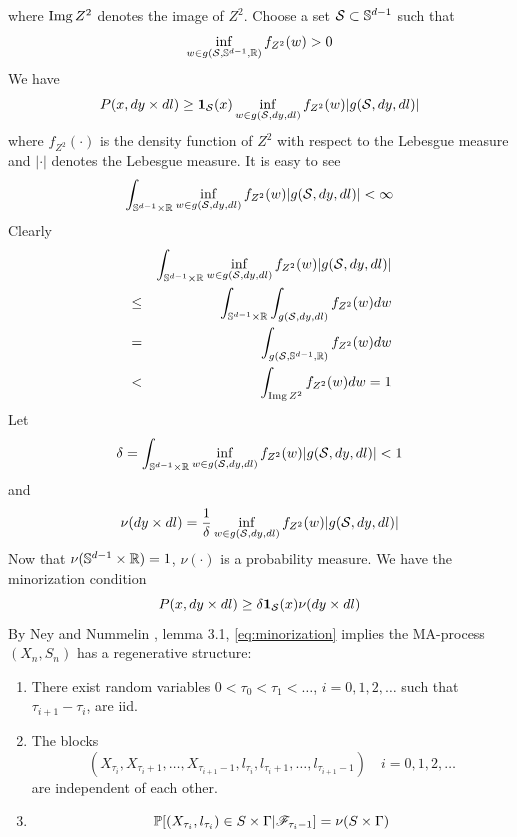 where $\img Z^2$ denotes the image of $Z^2$.
Choose a set $\mathcal S \subset \sphere^{d-1}$ such that
\[
\inf_{w \in g(\mathcal S, \sphere^{d-1}, \reals)} f_{Z^2}(w) > 0
\]
We have
\begin{eqnarray*}
  P(x, dy \times dl) \geq
  \I_{\mathcal S}(x) \inf_{w \in g(\mathcal S, dy, dl)} f_{Z^2}(w)
  | g(\mathcal S, dy, dl)| 
\end{eqnarray*}
where $f_{Z^2}(\cdot)$ is the density function of $Z^2$ with respect to the
Lebesgue measure and $|\cdot|$ denotes the Lebesgue measure. It is
easy to see
\[
\int_{\sphere^{d-1} \times \reals} \inf_{w \in g(\mathcal S, dy, dl)} f_{Z^2}(w)
| g(\mathcal S, dy, dl)| < \infty
\]
Clearly
\begin{eqnarray*}
  &&
  \int_{\sphere^{d-1} \times \reals} \inf_{w \in g(\mathcal S, dy, dl)} f_{Z^2}(w)
  | g(\mathcal S, dy, dl)| \\
  &\leq&
  \int_{\sphere^{d-1} \times \reals}
  \int_{g(\mathcal S, dy, dl)} f_{Z^2}(w) dw \\
  &=&
  \int_{g(\mathcal S, \sphere^{d-1}, \reals)} f_{Z^2}(w) dw \\
  &<&
  \int_{\img Z^2} f_{Z^2}(w) dw = 1
\end{eqnarray*}
Let
\[
\delta = \int_{\sphere^{d-1} \times \reals}
\inf_{w \in g(\mathcal S, dy, dl)} f_{Z^2}(w)
| g(\mathcal S, dy, dl)| < 1
\]
and
\[
\nu(dy \times dl) = {1 \over \delta}
\inf_{w \in g(\mathcal S, dy, dl)} f_{Z^2}(w)
| g(\mathcal S, dy, dl)|
\]
Now that $\nu(\sphere^{d-1} \times \reals) = 1$, $\nu(\cdot)$ is a
probability measure. We have the minorization condition
\begin{equation}
  \label{eq:minorization}
  P(x, dy \times dl) \geq \delta \I_{\mathcal S}(x) \nu(dy \times dl)
\end{equation}
By Ney and Nummelin \cite{ney:nummelin:1987}, lemma 3.1,
\eqref{eq:minorization} implies the MA-process $(X_n, S_n)$ has a
regenerative structure:
\begin{enumerate}[(1)]
\item There exist random variables $0 < \tau_0 < \tau_1 < \dots$,
  $i = 0, 1, 2, \dots$ such that $\tau_{i+1} - \tau_i$,  are iid.
\item The blocks
  \[
  (X_{\tau_i}, X_{\tau_i + 1}, \dots, X_{\tau_{i+1} - 1}, l_{\tau_i},
  l_{\tau_i + 1}, \dots, l_{\tau_{i+1} - 1}) \quad
  i = 0, 1, 2, \dots
  \]
  are independent of each other.
\item
  \[
  \P[(X_{\tau_i}, l_{\tau_i}) \in S \times \Gamma | \mathscr F_{\tau_i - 1}]
  = \nu(S \times \Gamma)
  \]
\end{enumerate}
